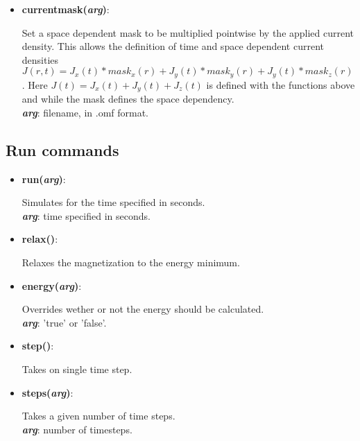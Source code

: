 \begin{itemize}
 \item {\vspace{-0.4cm}\textbf{currentmask(\textit{arg})}:
				\flushright\parbox{0.9 \textwidth}{\vspace{-0.25cm} 
				Set a space dependent mask to be multiplied pointwise by the applied current density.  This allows the definition of time and space dependent current densities $J(r,t) = J_x(t)*mask_x(r) + J_y(t)*mask_y(r) + J_y(t)*mask_z(r)$.  Here $J(t)= J_x(t) + J_y(t) + J_z(t)$ is defined with the functions above and while the mask defines the space dependency.\\
				\textbf{\textit{arg}}: filename, in .omf format.
				}\flushleft}

\end{itemize}



\subsection{Run commands}

\begin{itemize}

 \item {\textbf{run(\textit{arg})}:
				\flushright\parbox{0.9 \textwidth}{\vspace{-0.25cm} 
				Simulates for the time specified in seconds.\\
				\textbf{\textit{arg}}: time specified in seconds.
				}\flushleft}

 \item {\vspace{-0.4cm}\textbf{relax()}:
				\flushright\parbox{0.9 \textwidth}{\vspace{-0.25cm} 
				Relaxes the magnetization to the energy minimum.
				}\flushleft}

 \item {\vspace{-0.4cm}\textbf{energy(\textit{arg})}:
				\flushright\parbox{0.9 \textwidth}{\vspace{-0.25cm} 
				Overrides wether or not the energy should be calculated.\\
				\textbf{\textit{arg}}: 'true' or 'false'.
				}\flushleft}

 \item {\vspace{-0.4cm}\textbf{step()}:
				\flushright\parbox{0.9 \textwidth}{\vspace{-0.25cm} 
				Takes on single time step.
				}\flushleft}

 \item {\vspace{-0.4cm}\textbf{steps(\textit{arg})}:
				\flushright\parbox{0.9 \textwidth}{\vspace{-0.25cm} 
				Takes a given number of time steps.\\
				\textbf{\textit{arg}}: number of timesteps.
				}\flushleft}

\end{itemize}



